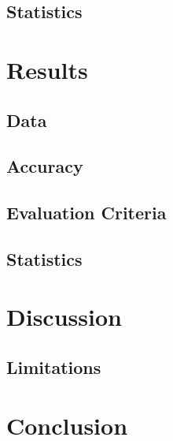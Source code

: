 \documentclass{article}
\begin{document}
\subsection{Statistics}



\section{Results}
%
\subsection{Data} %
%
\subsection{Accuracy}
%
\subsection{Evaluation Criteria}
%
\subsection{Statistics}
%



\section{Discussion}
%
\subsection{Limitations}



\section{Conclusion}
%





\end{document}
